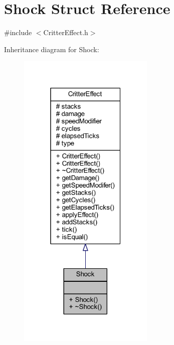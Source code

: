 \hypertarget{struct_shock}{\section{Shock Struct Reference}
\label{struct_shock}
}


{\ttfamily \#include $<$Critter\+Effect.\+h$>$}



Inheritance diagram for Shock\+:
\nopagebreak
\begin{figure}[H]
\begin{center}
\leavevmode
\includegraphics[width=184pt]{struct_shock__inherit__graph}
\end{center}
\end{figure}


